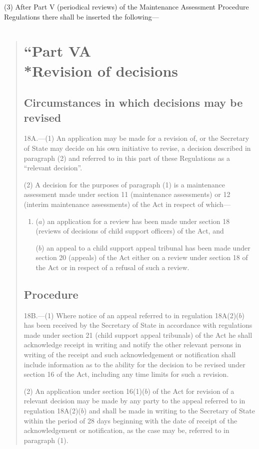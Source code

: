 \documentclass[12pt,a4paper]{article}
\begin{document}
(3) After Part V (periodical reviews) of the Maintenance Assessment Procedure Regulations there shall be inserted the following—
\begin{quotation}
\section*{“Part VA\\*Revision of decisions}

\subsection*{Circumstances in which decisions may be revised}

18A.—(1) An application may be made for a revision of, or the Secretary of State may decide on his own initiative to revise, a decision described in paragraph (2) and referred to in this part of these Regulations as a “relevant decision”.

(2) A decision for the purposes of paragraph (1) is a maintenance assessment made under section 11 (maintenance assessments) or 12 (interim maintenance assessments) of the Act in respect of which—
\begin{enumerate}\item[]
($a$) an application for a review has been made under section 18 (reviews of decisions of child support officers) of the Act, and

($b$) an appeal to a child support appeal tribunal has been made under section 20 (appeals) of the Act either on a review under section 18 of the Act or in respect of a refusal of such a review.
\end{enumerate}

\subsection*{Procedure}

18B.—(1) Where notice of an appeal referred to in regulation 18A(2)($b$) has been received by the Secretary of State in accordance with regulations made under section 21 (child support appeal tribunals) of the Act he shall acknowledge receipt in writing and notify the other relevant persons in writing of the receipt and such acknowledgement or notification shall include information as to the ability for the decision to be revised under section 16 of the Act, including any time limits for such a revision.

(2) An application under section 16(1)($b$) of the Act for revision of a relevant decision may be made by any party to the appeal referred to in regulation 18A(2)($b$) and shall be made in writing to the Secretary of State within the period of 28 days beginning with the date of receipt of the acknowledgement or notification, as the case may be, referred to in paragraph (1).


\end{quotation}
\end{document}
